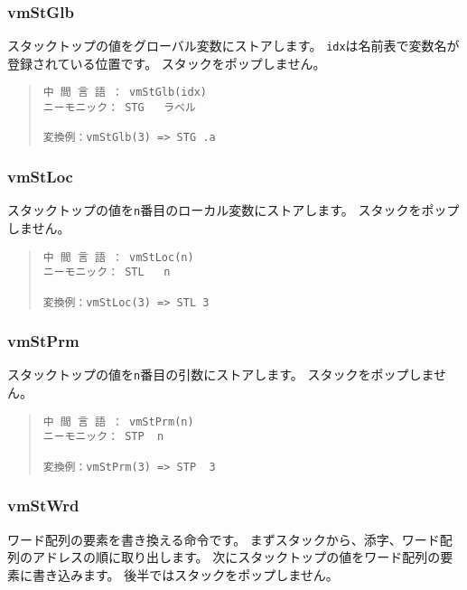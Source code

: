 \subsubsection{vmStGlb}

スタックトップの値をグローバル変数にストアします。
\verb/idx/は名前表で変数名が登録されている位置です。
スタックをポップしません。

\begin{quote}
\begin{verbatim}
中 間 言 語 ： vmStGlb(idx)
ニーモニック： STG   ラベル

変換例：vmStGlb(3) => STG .a
\end{verbatim}
\end{quote}

\subsubsection{vmStLoc}

スタックトップの値を\verb/n/番目のローカル変数にストアします。
スタックをポップしません。

\begin{quote}
\begin{verbatim}
中 間 言 語 ： vmStLoc(n)
ニーモニック： STL   n

変換例：vmStLoc(3) => STL 3
\end{verbatim}
\end{quote}

\subsubsection{vmStPrm}

スタックトップの値を\verb/n/番目の引数にストアします。
スタックをポップしません。

\begin{quote}
\begin{verbatim}
中 間 言 語 ： vmStPrm(n)
ニーモニック： STP  n   

変換例：vmStPrm(3) => STP  3
\end{verbatim}
\end{quote}

\subsubsection{vmStWrd}

ワード配列の要素を書き換える命令です。
まずスタックから、添字、ワード配列のアドレスの順に取り出します。
次にスタックトップの値をワード配列の要素に書き込みます。
後半ではスタックをポップしません。

